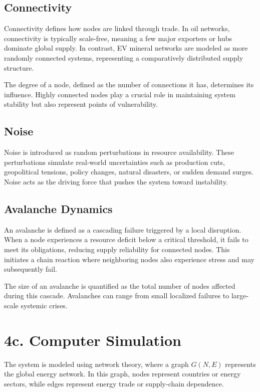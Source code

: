 \documentclass[12pt]{article}
\begin{document}
\subsection*{Connectivity}

Connectivity defines how nodes are linked through trade. In oil networks, connectivity is typically scale-free, meaning a few major exporters or hubs dominate global supply. In contrast, EV mineral networks are modeled as more randomly connected systems, representing a comparatively distributed supply structure.

The degree of a node, defined as the number of connections it has, determines its influence. Highly connected nodes play a crucial role in maintaining system stability but also represent points of vulnerability.

\subsection*{Noise}

Noise is introduced as random perturbations in resource availability. These perturbations simulate real-world uncertainties such as production cuts, geopolitical tensions, policy changes, natural disasters, or sudden demand surges. Noise acts as the driving force that pushes the system toward instability.

\subsection*{Avalanche Dynamics}

An avalanche is defined as a cascading failure triggered by a local disruption. When a node experiences a resource deficit below a critical threshold, it fails to meet its obligations, reducing supply reliability for connected nodes. This initiates a chain reaction where neighboring nodes also experience stress and may subsequently fail.

The size of an avalanche is quantified as the total number of nodes affected during this cascade. Avalanches can range from small localized failures to large-scale systemic crises.

\section{4c. Computer Simulation}

The system is modeled using network theory, where a graph $G(N,E)$ represents the global energy network. In this graph, nodes represent countries or energy sectors, while edges represent energy trade or supply-chain dependence.
\end{document}
